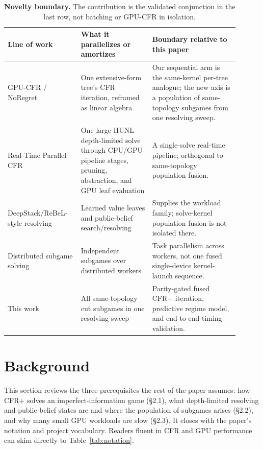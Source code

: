 \documentclass[11pt]{article}
\begin{document}
\begin{table}[t]
\centering
\small
\caption{\textbf{Novelty boundary.} The contribution is the validated conjunction in
the last row, not batching or GPU-CFR in isolation.}
\label{tab:novelty}
\begin{tabular}{>{\raggedright\arraybackslash}p{0.27\linewidth}
                >{\raggedright\arraybackslash}p{0.29\linewidth}
                >{\raggedright\arraybackslash}p{0.34\linewidth}}
\toprule
Line of work & What it parallelizes or amortizes & Boundary relative to this paper \\
\midrule
GPU-CFR / NoRegret~\citep{Kim2024,KimSandholm2026} & One extensive-form tree's CFR
iteration, reframed as linear algebra & Our sequential arm is the same-kernel per-tree
analogue; the new axis is a population of same-topology subgames from one resolving
sweep. \\
Real-Time Parallel CFR~\citep{RealTimeParallelCFR} & One large HUNL depth-limited solve
through CPU/GPU pipeline stages, pruning, abstraction, and GPU leaf evaluation & A
single-solve real-time pipeline; orthogonal to same-topology population fusion. \\
DeepStack/ReBeL-style resolving~\citep{Moravcik2017,Brown2020} & Learned value leaves
and public-belief search/resolving & Supplies the workload family; solve-kernel
population fusion is not isolated there. \\
Distributed subgame solving~\citep{Bowling2015,Tammelin2015} & Independent subgames
over distributed workers & Task parallelism across workers, not one fused
single-device kernel-launch sequence. \\
This work & All same-topology cut subgames in one resolving sweep & Parity-gated fused
CFR+ iteration, predictive regime model, and end-to-end timing validation. \\
\bottomrule
\end{tabular}
\end{table}

\section{Background}

This section reviews the three prerequisites the rest of the paper assumes: how CFR+
solves an imperfect-information game (\S2.1), what depth-limited resolving and public
belief states are and where the population of subgames arises (\S2.2), and why many
small GPU workloads are slow (\S2.3). It closes with the paper's notation and project
vocabulary. Readers fluent in CFR and GPU performance can skim directly to
Table~\ref{tab:notation}.
\end{document}
